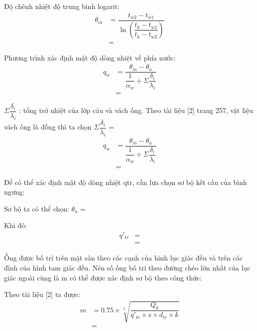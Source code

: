 Độ chênh nhiệt độ trung bình logarit:
\begin{equation*}
	\begin{split}
		\theta_{m} &= \dfrac{t_{w2} - t_{w1}}{\ln\left(\dfrac{t_{k} - t_{w1}}{t_{k} - t_{w2}}\right)}\\
		&=
	\end{split}
\end{equation*}

Phương trình xác định mật độ dòng nhiệt về phía nước:
\begin{equation*}
	\begin{split}
		q_{w} &= \dfrac{\theta_{m} - \theta_{a}}{\dfrac{1}{\alpha_{w}}+\Sigma\dfrac{\delta_{i}}{\lambda_{i}}}\\
		&=
	\end{split}
\end{equation*}

$\Sigma\dfrac{\delta_{i}}{\lambda_{i}}$ : tổng trở nhiệt của lớp cáu và vách ống. Theo tài liệu [2] trang 257, vật liệu vách ống là đồng thì ta chọn $\Sigma\dfrac{\delta_{i}}{\lambda_{i}}$ = 
\begin{equation*}
	\begin{split}
		q_{w} &= \dfrac{\theta_{m} - \theta_{a}}{\dfrac{1}{\alpha_{w}}+\Sigma\dfrac{\delta_{i}}{\lambda_{i}}}\\
		&=
	\end{split}
\end{equation*}

Để có thể xác định mật độ dòng nhiệt qtr, cần lưa chọn sơ bộ kết cấu của bình ngưng:

Sơ bộ ta có thể chọn: $\theta_{a}$ = 

Khi đó:
\begin{equation*}
	\begin{split}
		q'_{tr} &= \\
		&=
	\end{split}
\end{equation*}

Ống được bố trí trên mặt sàn theo các cạnh của hình lục giác đều và trên các đỉnh của hình tam giác đều. Nên số ống bố trí theo đường chéo lớn nhất của lục giác ngoài cùng là m có thể được xác định sơ bộ theo công thức:

Theo tài liệu [2] ta được:
\begin{equation*}
	\begin{split}
		m &= 0.75\times\sqrt[3]{\dfrac{Q_{k}}{q'_{tr}\times s\times d_{tr}\times k}} \\
		&=
	\end{split}
\end{equation*}

